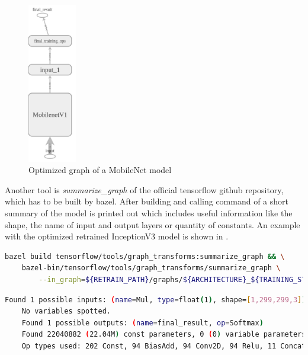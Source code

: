 \begin{figure}[htbp]
\centering
\includegraphics[height=7cm]{includes/graphMobilenet050-700Opt4}
\caption[Optimized graph of a MobileNet model]{Optimized graph of a MobileNet model}
\label{fig:MobileNetGraphOpt4}
\end{figure}


Another tool is \textit{summarize_graph} of the official tensorflow github repository, which has to be built by bazel. After building and calling command of  a short summary of the model is printed out which includes useful information like the shape, the name of input and output layers or quantity of constants. An example with the optimized retrained InceptionV3 model is shown in .

\begin{minipage}{\linewidth}
\begin{lstlisting}[caption=Build and call of \textit{summarize_graph}, label=list:summarize_graph, language=bash]
	bazel build tensorflow/tools/graph_transforms:summarize_graph && \
	bazel-bin/tensorflow/tools/graph_transforms/summarize_graph \
		--in_graph=${RETRAIN_PATH}/graphs/${ARCHITECTURE}_${TRAINING_STEPS}/retrained_dog_graph_${ARCHITECTURE}_${TRAINING_STEPS}_${LEARNING_RATE}.pb
\end{lstlisting}
\end{minipage}

\begin{minipage}{\linewidth}
\begin{lstlisting}[caption=Output of \textit{summarize_graph} on a retrained and optimized InceptionV3 model, label=list:summarize_graph_out, language=bash]
	Found 1 possible inputs: (name=Mul, type=float(1), shape=[1,299,299,3]) 
	No variables spotted.
	Found 1 possible outputs: (name=final_result, op=Softmax) 
	Found 22040882 (22.04M) const parameters, 0 (0) variable parameters, and 0 control_edges
	Op types used: 202 Const, 94 BiasAdd, 94 Conv2D, 94 Relu, 11 Concat, 9 AvgPool, 5 MaxPool, 1 Add, 1 MatMul, 1 	Placeholder, 1 PlaceholderWithDefault, 1 Reshape, 1 Softmax
\end{lstlisting}
\end{minipage}



